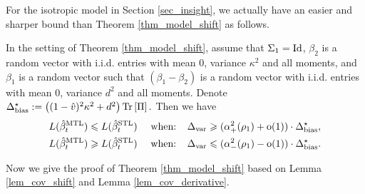 For the isotropic model in Section \ref{sec_insight}, we actually have an easier and sharper bound than Theorem \ref{thm_model_shift} as follows. 
\begin{lemma}\label{prop_model_shift_tight}
		In the setting of Theorem \ref{thm_model_shift}, assume that $\Sigma_1 =\operatorname{Id}$,
		$\beta_2$ is a random vector with i.i.d. entries with mean $0$, variance $\kappa^2$ and all moments, and $\beta_1$ is a random vector such that $(\beta_1 - \beta_2)$ is a random vector with i.i.d. entries with mean $0$, variance $d^2$ and all moments. Denote
		$\Delta^\star_{\text{bias}} := \left({(1 - \hat{v})^2 \kappa^2 + d^2}\right) \operatorname{Tr}\left[\Pi\right].$
	Then we have
		\begin{align*}
			L(\hat{\beta}_t^{\text{MTL}}) \leqslant L(\hat{\beta}_t^{\text{STL}})\quad \text{ when: }\ \  & \Delta_{\text{var}} \geqslant  (\alpha_+^2(\rho_1)+\operatorname{o}(1))\cdot  \Delta^\star_{\text{bias}}, \\
			L(\hat{\beta}_t^{\text{MTL}}) \geqslant L(\hat{\beta}_t^{\text{STL}})\quad \text{ when: }\ \  & \Delta_{\text{var}} \leqslant (\alpha_-^2(\rho_1)-\operatorname{o}(1))\cdot  \Delta^\star_{\text{bias}}.
		\end{align*}
\end{lemma}

Now we give the proof of Theorem \ref{thm_model_shift} based on Lemma \ref{lem_cov_shift} and Lemma \ref{lem_cov_derivative}. 

